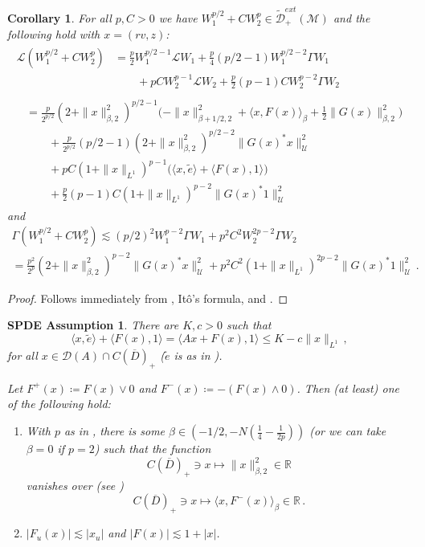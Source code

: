 \documentclass[final]{amsart}
\newtheorem{sass}{SPDE Assumption}[]
\newtheorem{cor}[thm]{Corollary}
\numberwithin{thm}{section}
\numberwithin{equation}{section}
\newcommand{\U}{\mathcal{U}}
\newcommand{\mcM}{\mathcal{M}}
\newcommand{\R}{\mathbb{R}}
\newcommand{\Dm}{\mathcal{D}}
\newcommand{\tDme}{\tilde{\mathcal{D}}^{ext}}
\newcommand{\Ll}{\mathcal{L}}
\newcommand{\ip}[2]{\langle #1, #2 \rangle}
\newcommand{\cdom}{C(\overline D)_+}
\begin{document}
\begin{cor}\label{cor:w1-w2-p-in-dme}
    For all $p,C > 0$ we have $W_1^{p/2} + CW_2^p \in \tDme_+(\mcM)$ and the following hold with $x = (rv, z)$:
\begin{multline*}
\begin{aligned}
    \Ll (W_1^{p/2} + CW_2^p) &= \frac{p}{2}W_1^{p/2 - 1}\Ll W_1 + \frac{p}{4}(p/2-1)W_1^{p/2-2}\Gamma W_1 \\ 
    &\qquad + pCW_2^{p-1}\Ll W_2 + \frac{p}{2}(p-1)CW_2^{p-2}\Gamma W_2 
\end{aligned}
    \\
\begin{aligned}
    &= \frac{p}{2^{p/2}}(2 + \|x\|_{\beta,2}^2)^{p/2-1}\Big(-\|x\|_{\beta+1/2,2}^2 +\ip{x}{F(x)}_\beta + \frac{1}{2}\|G(x)\|_{\beta,2}^2\Big) \\
    &\qquad + \frac{p}{2^{p/2}}(p/2-1)(2+\|x\|_{\beta,2}^2)^{p/2-2}\|G(x)^*x\|_\U^2 \\
    &\qquad + pC(1+\|x\|_{L^1})^{p-1}\Big(\ip{x}{\tilde e} + \ip{F(x)}{1}\Big) \\    
    &\qquad + \frac{p}{2}(p-1)C(1+\|x\|_{L^1})^{p-2}\|G(x)^*1\|_\U^2 
\end{aligned}
\end{multline*}
and
\begin{multline*}
    \Gamma(W_1^{p/2} + CW_2^p) \lesssim (p/2)^2W_1^{p-2}\Gamma W_1 + p^2C^2W_2^{2p-2}\Gamma W_2 \\
    = \frac{p^2}{2^p}(2+\|x\|_{\beta,2}^2)^{p-2}\|G(x)^*x\|_\U^2 + p^2C^2(1+\|x\|_{L^1})^{2p-2}\|G(x)^*1\|_\U^2  \,.
\end{multline*}    
\end{cor}

\begin{proof}
    Follows immediately from , It\^{o}'s formula, and .
\end{proof}


\begin{sass}\label{SPDE-lyap}
There are $K,c > 0$ such that
\begin{equation}\label{eq:l-l1-bound}
   \ip{x}{\tilde e} + \ip{F(x)}{1} = \ip{Ax + F(x)}{1} \leq K - c\|x\|_{L^1} \,,
\end{equation}
for all $x \in \Dm(A) \cap \cdom$ ($\tilde e$ is as in ).

Let $F^+(x) \coloneqq F(x) \vee 0$ and $F^-(x) \coloneqq -(F(x) \wedge 0)$. Then (at least) one of the following hold:
\begin{enumerate}[label = (\roman*)]
    \item \label{case-1} With $p$ as in , there is some $\beta \in (-1/2,-N(\frac{1}{4} - \frac{1}{2p}))$ (or we can take $\beta = 0$ if $p = 2$) such that the function
    $$\cdom \ni x \mapsto \|x\|_{\beta,2}^2 \in \R$$
    vanishes over (see ) 
    $$\cdom \ni x \mapsto \ip{x}{F^-(x)}_\beta \in \R \,.$$
    \item \label{case-2} $|F_u(x)| \lesssim |x_u|$ and $|F(x)| \lesssim 1+|x|$.
\end{enumerate}
\end{sass}
\end{document}

